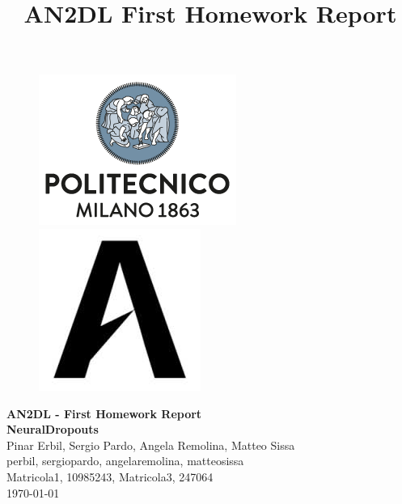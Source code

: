 \documentclass[11pt]{article}
\title{AN2DL First Homework Report}
\begin{document}
    
    \begin{figure}[H]
        \raggedright
        \includegraphics[scale=0.4]{polimi.png} \hfill \includegraphics[scale=0.3]{airlab.jpeg}
    \end{figure}
    
    \vspace{5mm}
    
    \begin{center}
        {\Large \textbf{AN2DL - First Homework Report}}\\
        \vspace{2mm}
        {\Large \textbf{NeuralDropouts}}\\
        \vspace{2mm}
        {\large Pinar Erbil,}
        {\large Sergio Pardo,}
        {\large Angela Remolina,}
        {\large Matteo Sissa}\\
        \vspace{2mm}
        {perbil,}
        {sergiopardo,}
        {angelaremolina,}
        {matteosissa}\\
        \vspace{2mm}
        {Matricola1,}
        {10985243,}
        {Matricola3,}
        {247064}\\
        \vspace{5mm}
        \today
    \end{center}    
    \vspace{5mm}
    
\end{document}
